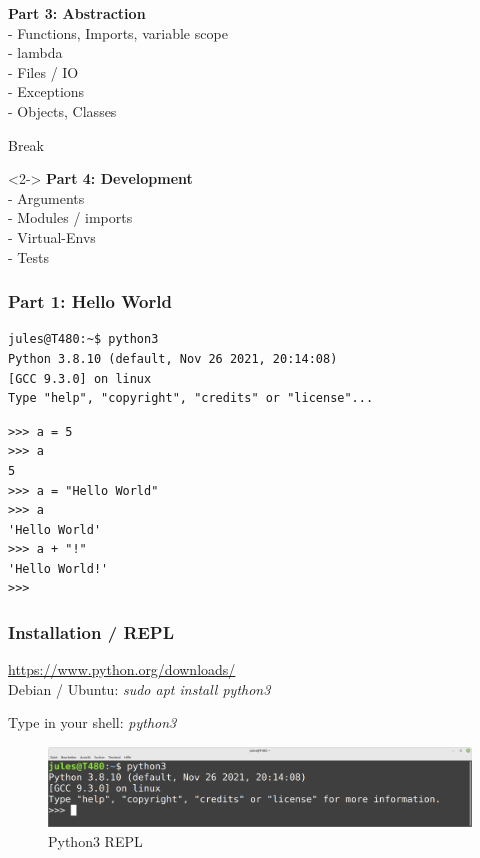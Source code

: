 \documentclass{beamer}
\begin{document}
\begin{frame}
	\begin{block}{}
		\textbf{Part 3: Abstraction}\\
		- Functions, Imports, variable scope\\
		- lambda\\
		- Files / IO\\
		- Exceptions\\
		- Objects, Classes\\
	\end{block}
	\begin{exampleblock}{}
	Break
	\end{exampleblock}
	\begin{block}{}<2->
		\textbf{Part 4: Development}\\
		- Arguments\\
		- Modules / imports\\
		- Virtual-Envs\\
		- Tests
	\end{block}
\end{frame}

\begin{frame}[fragile]
	\frametitle{\textbf{Part 1:} Hello World}
	\begin{verbatim}
jules@T480:~$ python3
Python 3.8.10 (default, Nov 26 2021, 20:14:08) 
[GCC 9.3.0] on linux
Type "help", "copyright", "credits" or "license"...
	\end{verbatim}
\begin{verbatim}
>>> a = 5
>>> a
5
>>> a = "Hello World"
>>> a
'Hello World'
>>> a + "!"
'Hello World!'
>>> 
	\end{verbatim}
\end{frame}

\begin{frame}
	\frametitle{Installation / REPL}
	\begin{center}
		\url{https://www.python.org/downloads/}\\
		Debian / Ubuntu: \textit{sudo apt install python3}\\
	\end{center}
	\begin{center}
		Type in your shell: \textit{python3}
	\end{center}
\end{frame}

\begin{frame}
	\begin{figure}
		\includegraphics[width=12cm]{figures/console.png}
		\caption{Python3 REPL}
	\end{figure}
\end{frame}
\end{document}
